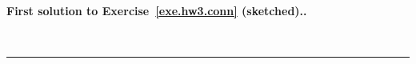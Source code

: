\documentclass[numbers=enddot,12pt,final,onecolumn,notitlepage]{scrartcl}%
\theoremstyle{definition}
\newenvironment{proof}[1][Proof]{\noindent\textbf{#1.} }{\ \rule{0.5em}{0.5em}}
\newcommand{\set}[1]{\left\{ #1 \right\}}
\newcommand{\tup}[1]{\left( #1 \right)}
\newcommand{\ive}[1]{\left[ #1 \right]}
\begin{document}
\begin{proof}[First solution to Exercise~\ref{exe.hw3.conn}
(sketched).]
  

\end{proof}
\end{document}
